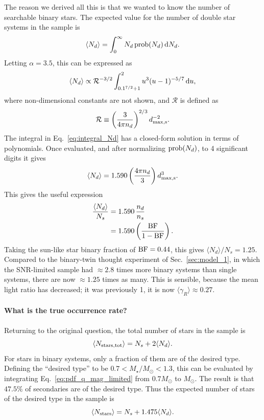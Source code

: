 \documentclass{emulateapj}
\begin{document}
The reason we derived all this is that we wanted to know the number of 
searchable binary stars.
The expected value for the number of double star systems in the sample is
\begin{equation}
\langle N_d \rangle = \int_{0}^{\infty} N_d\, {\rm prob}(N_d) \,{\rm d}N_d.
\end{equation}
Letting $\alpha=3.5$, this can be expressed as
\begin{equation}
\langle N_d \rangle \propto \mathcal{R}^{-3/2}
\int_{0.1^{7/2} + 1}^{2} u^3 (u-1)^{-5/7} \,{\rm d}u ,
\label{eq:integral_Nd}
\end{equation}
where non-dimensional constants are not shown, and $\mathcal{R}$ is defined as
\begin{equation}
\mathcal{R} \equiv \left(\frac{3}{4\pi n_d}\right)^{2/3} d_{\rm max,s}^{-2}.
\end{equation}
The integral in Eq.~\ref{eq:integral_Nd} has a closed-form solution in terms 
of polynomials. Once evaluated, and after 
normalizing ${\rm prob}(N_d)$, to 4 significant digits it gives
\begin{equation}
\langle N_d \rangle = 1.590 \left(\frac{4\pi n_d}{3}\right) d_{\rm max,s}^3.
\end{equation}
This gives the useful expression
\begin{align}
\frac{\langle N_d \rangle}{N_s} &= 1.590\, \frac{n_d}{n_s} \\
&= 1.590 \left(\frac{{\rm BF}}{1-{\rm BF}}\right).
\end{align}
Taking the sun-like star binary fraction of ${\rm BF} = 0.44$, this gives
$\langle N_d \rangle / N_s = 1.25$.
Compared to the binary-twin thought experiment of Sec.~\ref{sec:model_1}, in 
which the SNR-limited sample had $\approx 2.8$ times more binary systems than 
single systems, there are now $\approx 1.25$ times as many.
This is sensible, because the mean light ratio has decreased; it was 
previously 1, it is now $\langle \gamma_R \rangle \approx 0.27$.

\paragraph{What is the true occurrence rate?}

Returning to the original question, the total number of stars in the sample is
\begin{equation}
\langle N_{\rm stars,tot} \rangle = N_s + 2 \langle N_d \rangle.
\end{equation}
For stars in binary systems, only a fraction of them are of the desired type.
Defining the ``desired type'' to be $0.7<M_\star/M_\odot<1.3$, this can be 
evaluated by integrating Eq.~\ref{eq:pdf_q_mag_limited} from $0.7M_\odot$ to 
$M_\odot$.
The result is that $47.5\%$ of secondaries are of the desired type.
Thus the expected number of stars of the desired type in the sample is
\begin{equation}
\langle N_{\rm stars} \rangle = N_s + 1.475 \langle N_d \rangle.
\end{equation}
\end{document}
